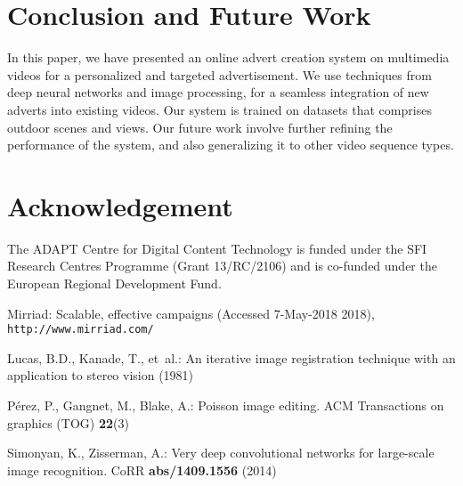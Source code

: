 \documentclass[runningheads]{llncs}
\begin{document}
\section{Conclusion and Future Work}
\vspace{-0.1in}
In this paper, we have presented an online advert creation system on multimedia videos for a personalized and targeted advertisement. We use techniques from deep neural networks and image processing, for a seamless integration of new adverts into existing videos. Our system is trained on datasets that comprises outdoor scenes and views. Our future work involve further refining the performance of the system, and also generalizing it to other video sequence types. 



\small{
\section*{Acknowledgement}
\vspace{-0.1in}
The ADAPT Centre for Digital Content Technology is funded under the SFI Research Centres Programme (Grant 13/RC/2106) and is co-funded under the European Regional Development Fund.
}

\vspace{-0.2in}
%
%
\begin{thebibliography}{1}
\providecommand{\url}[1]{\texttt{#1}}
\providecommand{\urlprefix}{URL }
\providecommand{\doi}[1]{https://doi.org/#1}

Mirriad: Scalable, effective campaigns (Accessed 7-May-2018 2018),
  \url{http://www.mirriad.com/}

Lucas, B.D., Kanade, T., et~al.: An iterative image registration technique with
  an application to stereo vision  (1981)

P{\'e}rez, P., Gangnet, M., Blake, A.: Poisson image editing. ACM Transactions
  on graphics (TOG)  \textbf{22}(3)

Simonyan, K., Zisserman, A.: Very deep convolutional networks for large-scale
  image recognition. CoRR  \textbf{abs/1409.1556} (2014)

\end{thebibliography}
\end{document}
